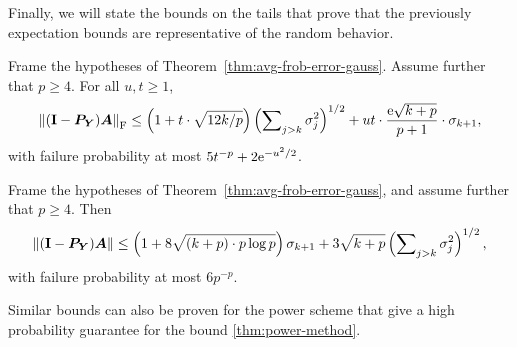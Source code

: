 Finally, we will state the bounds on the tails that prove that the 
previously expectation bounds are representative of the random behavior.

\begin{theorem} \label{thm:tail-frob-error-gauss}
Frame the hypotheses of Theorem~\ref{thm:avg-frob-error-gauss}.
Assume further that $p \geq 4$.  For all $u, t \geq 1$,
$$
\left\Vert { (\mathbf{I}- \bm{P}_{\bm{Y}}) \bm{A} } \right\Vert_{\mathrm{F}}
    \leq \left( 1 + t \cdot \sqrt{12k/p} \right)
    \left( \sum\nolimits_{j > k} \sigma_j^2 \right)^{1/2}
    + ut \cdot \frac{\mathrm{e}\sqrt{k+p}}{p+1} \cdot \sigma_{k+1},
$$
with failure probability at most $5 t^{-p} + 2 \mathrm{e}^{-u^2/2}$.
\end{theorem}

\begin{theorem} \label{thm:tail-spec-error-gauss}
Frame the hypotheses of Theorem~\ref{thm:avg-frob-error-gauss}, and assume further that $p \geq 4$.  Then
$$
\left\Vert { (\mathbf{I}- \bm{P}_{\bm{Y}}) \bm{A} } \right\Vert
    \leq \left( 1 + 8 \sqrt{(k + p) \cdot p \log p} \right) \sigma_{k+1}
        + 3 \sqrt{k+p} \left( \sum\nolimits_{j > k} \sigma_j^2 \right)^{1/2},
$$
with failure probability at most $6 p^{-p}$.
\end{theorem}
Similar bounds can also be proven for the power scheme 
\cite{halko2011finding} that give a high probability guarantee for 
the bound \ref{thm:power-method}.



